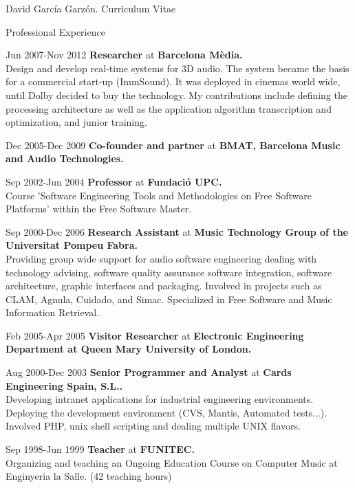 \documentclass{article}
\begin{document}
\begin{cv}{David García Garzón. Curriculum Vitae}
\begin{cvlist}{Professional Experience}
\item[Jun 2007-Nov 2012]
{\bf Researcher} at
{\bf Barcelona Mèdia.}\\
Design and develop real-time systems for 3D audio.
The system became the basis for a commercial start-up (ImmSound).
It was deployed in cinemas world wide, until Dolby decided to buy the technology.
My contributions include defining the processing architecture as well as the application
algorithm transcription and optimization, and junior training.


\item[Dec 2005-Dec 2009]
{\bf Co-founder and partner} at
{\bf BMAT, Barcelona Music and Audio Technologies.}\\


\item[Sep 2002-Jun 2004]
{\bf Professor} at
{\bf Fundació UPC.}\\
Course 'Software Engineering Tools and Methodologies on
Free Software Platforms' within the Free Software Master.


\item[Sep 2000-Dec 2006]
{\bf Research Assistant} at
{\bf Music Technology Group of the Universitat Pompeu Fabra.}\\
Providing group wide support for audio software engineering
dealing with technology advising, software quality assurance
software integration, software architecture, graphic interfaces and packaging.
Involved in projects such as CLAM, Agnula, Cuidado, and Simac.
Specialized in Free Software and Music Information Retrieval.


\item[Feb 2005-Apr 2005]
{\bf Visitor Researcher} at
{\bf Electronic Engineering Department at Queen Mary University of London.}\\


\item[Aug 2000-Dec 2003]
{\bf Senior Programmer and Analyst} at
{\bf Cards Engineering Spain, S.L..}\\
Developing intranet applications for industrial engineering environments.
Deploying the development environment (CVS, Mantis, Automated tests...).
Involved PHP, unix shell scripting and dealing multiple UNIX flavors.


\item[Sep 1998-Jun 1999]
{\bf Teacher} at
{\bf FUNITEC.}\\
Organizing and teaching an Ongoing Education Course on Computer Music at Enginyeria la Salle. (42 teaching hours)


\end{cvlist}
\end{cv}
\end{document}
